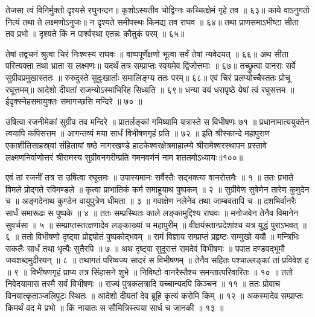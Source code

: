 तेजसा त्वं विनिर्मुक्तो दृश्यसे रघुनन्दन॥
कृशोऽस्यतीव चोद्विग्नः कच्चित्क्षेमं गृहे तव ॥ ६३॥
काये वाऽनुगतो नित्यं तथा ते लक्ष्मणोऽनुजः॥
न दृश्यते समीपस्थः किमद्य तव राघव ॥ ६४॥
तथा प्राणसमाऽभीष्टा सीता तव प्रभो ॥
दृश्यते किं न पार्श्वस्था एतन्नः कौतुकं परम् ॥ ६५॥

तेषां तद्वचनं श्रुत्वा चिरं निःश्वस्य राघवः ॥
वाष्पपूर्णेक्षणो भूत्वा सर्वं तेषां न्यवेदयत् ॥ ६६॥
अथ सीता परित्यक्ता तथा भ्राता स लक्ष्मणः॥
यदर्थं तत्र सम्प्राप्तः स्वयमेव द्विजोत्तमाः ॥ ६७॥
तच्छ्रुत्वा वानराः सर्वे सुग्रीवप्रमुखास्ततः ॥
रुरुदुस्ते सुदुःखार्ताः समालिङ्ग्य ततः परम्॥ ६८॥
एवं चिरं प्रलप्योच्चैस्ततः प्रोचू रघूत्तमम्॥
आदेशो दीयतां राजन्योऽस्माभिरिह सिध्यति ॥ ६९॥
धन्या वयं धरापृष्ठे येषां त्वं रघुसत्तम ॥
ईदृक्स्नेहसमायुक्तः समागच्छसि मन्दिरे ॥ ७० ॥

उषित्वा रजनीमेकां सुग्रीव तव मन्दिरे ॥
प्रातर्लङ्कां गमिष्यामि यत्रास्ते स विभीषणः ७१ ॥
प्रधानामात्ययुक्तेन त्वयापि कपिसत्तम ॥
आगन्तव्यं मया सार्धं विभीषणगृहं प्रति ॥ ७२ ॥
इति श्रीस्कान्दे महापुराण एकाशीतिसाहस्र्यां संहितायां षष्ठे नागरखण्डे हाटकेश्वरक्षेत्रमाहात्म्ये श्रीरामेश्वरस्थापन प्रस्तावे लक्ष्मणनिर्वाणोत्तरं श्रीरामस्य सुग्रीवनगरीम्प्रति गमनवर्णनं नाम शततमोऽध्यायः॥१००॥


एवं तां रजनीं तत्र स उषित्वा रघूत्तमः ॥
उपास्यमानः सर्वैस्तैः सद्भक्त्या वानरोत्तमैः ॥ १ ॥
ततः प्रभाते विमले प्रोद्गते रविमण्डले ॥
कृत्वा प्राभातिकं कर्म समाहूयाथ पुष्पकम् ॥ २ ॥
सुग्रीवेण सुषेणेन तारेण कुमुदेन च ॥
अङ्गदेनाथ कुण्डेन वायुपुत्रेण धीमता ॥ ३ ॥
गवाक्षेण नलेनेव तथा जाम्बवतापि च ॥
दशभिर्वानरैः सार्धं समारूढः स पुष्पके ॥ ४ ॥
ततः सम्प्रस्थितः काले लङ्कामुद्दिश्य राघवः ॥
मनोजवेन तेनैव विमानेन सुवर्चसा ॥ ५ ॥
सम्प्राप्तस्तत्क्षणादेव लङ्काख्यां च महापुरीम् ॥
वीक्षयंस्तान्प्रदेशांश्च यत्र युद्धं पुराऽभवत् ॥ ६ ॥
ततो विभीषणो दृष्ट्वा प्रोद्द्योतं पुष्पकोद्भवम् ॥
रामं विज्ञाय सम्प्राप्तं प्रहृष्टः सम्मुखो ययौ ॥
मन्त्रिभिः सकलैः सार्धं तथा भृत्यैः सुतैरपि ॥ ७ ॥
अथ दृष्ट्वा सुदूरात्तं रामदेवं विभीषणः ॥
पपात दण्डवद्भूमौ जयशब्दमुदीरयन् ॥ ८ ॥
तथागतं परिष्वज्य सादरं स विभीषणम् ॥
तेनैव सहितः पश्चाल्लङ्कां तां प्रविवेश ह ॥ ९ ॥
विभीषणगृहं प्राप्य तत्र सिंहासने शुभे ॥
निविष्टो वानरैस्तैश्च समन्तात्परिवारितः ॥ १० ॥
ततो निवेदयामास तस्मै सर्वं विभीषणः ॥
राज्यं पुत्रकलत्रादि यच्चान्यदपि किञ्चन ॥ ११ ॥
ततः प्रोवाच विनयात्कृताञ्जलिपुटः स्थितः ॥
आदेशो दीयतां देव ब्रूहि कृत्यं करोमि किम् ॥ १२ ॥
अकस्मादेव सम्प्राप्तः किमर्थं वद मे प्रभो ॥
किं नायातः स सौमित्रिस्त्वया सार्ध च जानकी ॥ १३ ॥

